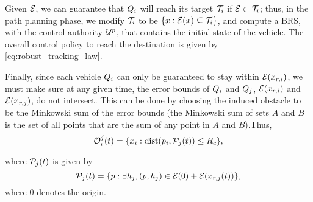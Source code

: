 Given $\mathcal{E}$, we can guarantee that $Q_i$ will reach its target $\mathcal{T}_i$ if $\mathcal{E} \subset \mathcal{T}_i$; thus, in the path planning phase, we modify $\mathcal{T}_i$ to be $\{x: \mathcal{E}(x) \subseteq \mathcal{T}_i\}$, and compute a BRS, with the control authority $\mathcal{U}^p$, that contains the initial state of the vehicle. The overall control policy to reach the destination is given by \ref{eq:robust_tracking_law}.

Finally, since each vehicle $Q_i$ can only be guaranteed to stay within $\mathcal{E}(x_{r,i})$, we must make sure at any given time, the error bounds of $Q_i$ and $Q_j$, $\mathcal{E}(x_{r,i})$ and $\mathcal{E}(x_{r,j})$, do not intersect. This can be done by choosing the induced obstacle to be the Minkowski sum of the error bounds (the Minkowski sum of sets $A$ and $B$ is the set of all points that are the sum of any point in $A$ and $B$).Thus,
\vspace{-0.3em}
\begin{equation}
\mathcal{O}_i^j(t) = \{x_i: \text{dist}(p_i, \mathcal{P}_j(t)) \le R_c \},
\end{equation}

\noindent where $\mathcal{P}_j(t)$ is given by
\vspace{-0.4em}
\begin{equation}
\mathcal{P}_j(t) = \{p: \exists h_j, (p, h_j) \in \mathcal{E}(0) + \mathcal{E}(x_{r,j}(t)) \},
\end{equation}
\noindent where $0$ denotes the origin. 


